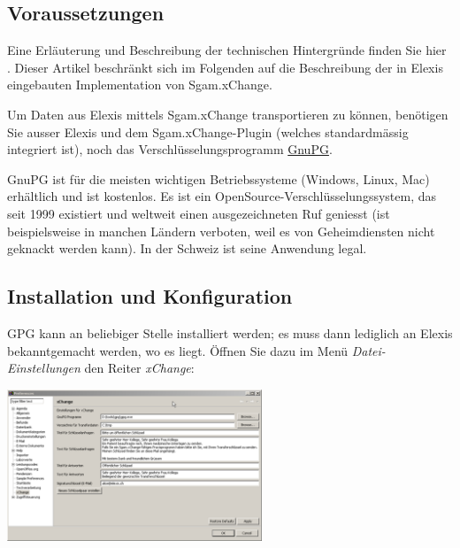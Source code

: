 \subsection{Voraussetzungen}


Eine Erläuterung und Beschreibung der technischen Hintergründe finden Sie hier .
 Dieser Artikel beschränkt sich im Folgenden auf die Beschreibung der in Elexis eingebauten Implementation von Sgam.xChange.

Um Daten aus Elexis mittels Sgam.xChange transportieren zu können, benötigen Sie ausser Elexis und dem Sgam.xChange-Plugin (welches standardmässig integriert ist), noch das Verschlüsselungsprogramm \href{http://www.gnupg.org}{GnuPG}.

 GnuPG ist für die meisten wichtigen Betriebssysteme (Windows, Linux, Mac) erhältlich und ist kostenlos. Es ist ein OpenSource-Verschlüsselungssystem, das seit 1999 existiert und weltweit einen ausgezeichneten Ruf geniesst (ist beispielsweise in manchen Ländern verboten, weil es von Geheimdiensten nicht geknackt werden kann). In der Schweiz ist seine Anwendung legal.

\subsection{Installation und Konfiguration}

GPG kann an beliebiger Stelle installiert werden; es muss dann lediglich an Elexis bekanntgemacht werden, wo es liegt. Öffnen Sie dazu im Menü \textit{Datei-Einstellungen} den Reiter \textit{xChange}:

\includegraphics[width=3in]{images/xc1.png}

